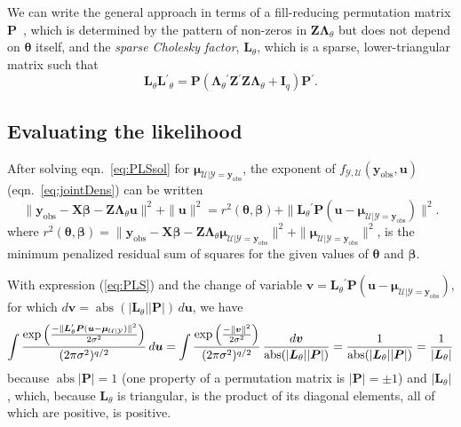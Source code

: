 \documentclass{jss}
\newcommand{\abs}{\operatorname{abs}}
\newcommand{\bLt}{\ensuremath{\bm\Lambda_\theta}}
\newcommand{\mc}[1]{\ensuremath{\mathcal{#1}}}
\newcommand{\trans}{\ensuremath{^\prime}}
\newcommand{\yobs}{\ensuremath{\bm y_{\mathrm{obs}}}}
\begin{document}
We can write the general approach in terms of a fill-reducing
permutation matrix $\bm P$~\citep[Ch.~7]{davis06:csparse_book}, which
is determined by the pattern of non-zeros in $\bm Z\bLt$ but does
not depend on $\bm\theta$ itself, and the \emph{sparse Cholesky
  factor}, $\bm L_\theta$, which is a sparse, lower-triangular matrix
such that%
\begin{equation}
  \label{eq:sparseChol}
  \bm L_\theta\bm L\trans_\theta=\bm P
  \left(\bLt\trans\bm Z\trans\bm Z\bLt+\bm I_q\right)
  \bm P\trans.
\end{equation}%

\subsection{Evaluating the likelihood}
\label{sec:evallike}

After solving eqn.~\ref{eq:PLSsol} for $\bm\mu_{\mc U|\mc Y=\yobs}$,
the exponent of $f_{\mc Y,\mc U}(\yobs, \bm u)$
(eqn.~\ref{eq:jointDens}) can be written%
\begin{equation}
  \label{eq:PLS}
  \|\yobs-\bm X\bm\beta-\bm Z\bLt\bm u\|^2+\|\bm u\|^2=
  r^2(\bm\theta,\bm\beta)+
  \|\bm L_\theta\trans\bm P(\bm u-\bm\mu_{\mc U|\mc Y=\yobs})\|^2.
\end{equation}%
where $r^2(\bm\theta,\bm\beta)=\|\yobs-\bm X\bm\beta-
\bm Z\bm\Lambda_\theta\bm\mu_{\mc U|\mc Y=\yobs}\|^2+
\|\bm\mu_{\mc U|\mc Y=\yobs}\|^2$, is the minimum
penalized residual sum of squares for the given values of $\bm\theta$ and
$\bm\beta$.

With expression (\ref{eq:PLS}) and the change of variable $\bm v=\bm
L_\theta\trans\bm P(\bm u-\bm\mu_{\mc U|\mc Y=\yobs})$, for which $d\bm
v=\abs(|\bm L_\theta||\bm P|)\,d\bm u$, we have%
\begin{equation}
  \label{eq:intExpr}
  \int\frac{\exp\left(\frac{-\|\bm L_\theta\trans\bm P(\bm u-\bm\mu_{\mc U|\mc Y})\|^2}
      {2\sigma^2}\right)}
  {(2\pi\sigma^2)^{q/2}}\,d\bm u \\
  = \int\frac{\exp\left(\frac{-\|\bm
        v\|^2}{2\sigma^2}\right)}{(2\pi\sigma^2)^{q/2}}\,\frac{d\bm
    v}{\abs(|\bm L_\theta||\bm P|)} = \frac{1}{\abs(|\bm L_\theta||\bm
    P|)}=\frac{1}{|\bm L_\theta|}
\end{equation}%
because $\abs|\bm P|=1$ (one property of a permutation matrix is $|\bm
P|=\pm1$) and $|\bm L_\theta|$, which, because $\bm L_\theta$ is triangular, is the
product of its diagonal elements, all of which are positive, is
positive.
\end{document}
